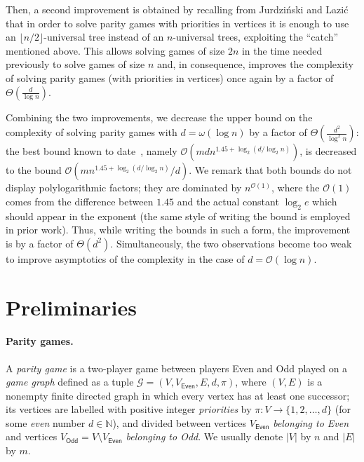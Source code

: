 \documentclass[envcountsect,envcountsame]{llncs}
\newcommand{\Gg}{\mathcal{G}}
\newcommand{\Oo}{\mathcal{O}}
\newcommand{\Even}{\mathsf{Even}}
\newcommand{\Odd}{\mathsf{Odd}}
\newcommand{\floor}[1]{\lfloor#1\rfloor}
\begin{document}
	Then, a second improvement is obtained by recalling from Jurdziński and Lazić~\cite{progress-measure} that
	in order to solve parity games with priorities in vertices it is enough to use an $\floor{n/2}$-universal tree
	instead of an $n$-universal trees, exploiting the ``catch'' mentioned above.
	This allows solving games of size $2n$ in the time needed previously to solve games of size $n$
	and, in consequence, improves the complexity of solving parity games (with priorities in vertices) once again by a factor of $\Theta\left(\frac{d}{\log n}\right)$.

	Combining the two improvements, we decrease the upper bound on the complexity of solving parity games with $d=\omega(\log n)$ by a factor of $\Theta\left(\frac{d^2}{\log^2 n}\right)$:
	the best bound known to date~\cite{fijalkow,progress-measure}, namely $\Oo(mdn^{1{.}45+\log_2(d/\log_2 n)})$, is decreased to the bound $\Oo(mn^{1{.}45+\log_2(d/\log_2 n)}/d)$.
	We remark that both bounds do not display polylogarithmic factors; they are dominated by $n^{\Oo(1)}$,
	where the $\Oo(1)$ comes from the difference between $1{.}45$ and the actual constant $\log_2 e$ which should appear in the exponent
	(the same style of writing the bound is employed in prior work).
	Thus, while writing the bounds in such a form, the improvement is by a factor of $\Theta(d^2)$.
	Simultaneously, the two observations become too weak to improve asymptotics of the complexity in the case of $d=\Oo(\log n)$.


\section{Preliminaries}

\paragraph{Parity games.}

	A \emph{parity game} is a two-player game between players Even and Odd
	played on a \emph{game graph} defined as a tuple $\Gg=(V,V_\Even,E,d,\pi)$,
	where $(V,E)$ is a nonempty finite directed graph in which every vertex has at least one successor;
	its vertices are labelled with positive integer \emph{priorities} by $\pi\colon V\rightarrow\{1,2,\dots,d\}$ (for some \emph{even} number $d\in\mathbb{N}$), and
	divided between vertices $V_\Even$ \emph{belonging to Even} and vertices $V_\Odd=V\setminus V_\Even$ \emph{belonging to Odd}.
	We usually denote $|V|$ by $n$ and $|E|$ by $m$.
\end{document}
